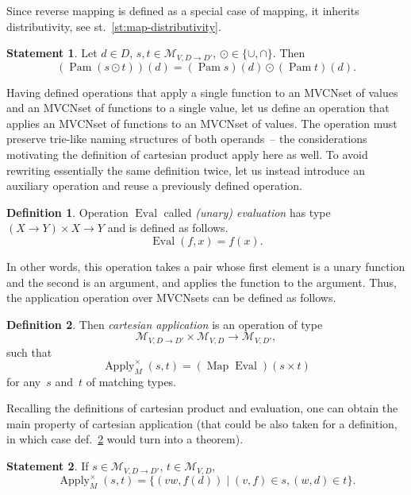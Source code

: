 \documentclass{article}
\theoremstyle{definition}
\newtheorem{Df}{Definition}
\newtheorem{St}{Statement}
\newcommand{\setcharmvcn}{M}
\newcommand{\setsymbol}[3]{\mathcal{#1}_{#2,#3}}
\newcommand{\setmvcn}[2]{\setsymbol{\setcharmvcn}{#1}{#2}}
\newcommand{\fmap}{\operatorname{Map}}
\newcommand{\fpam}{\operatorname{Pam}}
\newcommand{\apply}{\operatorname{Apply}}
\newcommand{\eval}{\operatorname{Eval}}
\begin{document}
Since reverse mapping is defined as a special case of mapping, it inherits
distributivity, see st.~\ref{st:map-distributivity}.

\begin{St}\label{st:pam-distributivity}
Let $d\in D$, $s, t \in \setmvcn{V}{D \to D'}$, $\odot \in \{\cup, \cap \}$. Then
\[
  (\fpam (s \odot t))(d) = (\fpam s)(d) \odot (\fpam t)(d) .
\]
\end{St}

Having defined operations that apply a single function to an MVCNset of values
and an MVCNset of functions to a single value, let us define an
operation that applies an MVCNset of functions to an MVCNset of values. The
operation must preserve trie-like naming structures of both operands~-- the
considerations motivating the definition of cartesian product apply here
as well. To avoid rewriting essentially the same definition twice, let us
instead introduce an auxiliary operation and reuse a previously defined
operation.

\begin{Df}\label{df:eval}
Operation $\eval$ called \emph{(unary) evaluation} has type
$(X \to Y) \times X \to Y$ and is defined as follows.
\[
  \eval (f, x) = f(x) .
\]
\end{Df}

In other words, this operation takes a pair whose first element is a unary
function and the second is an argument, and applies the function to the
argument. Thus, the application operation over MVCNsets can be defined as
follows.

\begin{Df}\label{df:mvcn-apply-cartesian}
Then \emph{cartesian application} is an operation of type
\[
\setmvcn{V}{D\to D'} \times \setmvcn{V}{D} \to \setmvcn{V}{D'} ,
\]
such that
\[
  \apply_{\setcharmvcn}^{\times} (s, t) = (\fmap \eval) (s \times t)
\]
for any~$s$ and~$t$ of matching types.
\end{Df}

Recalling the definitions of cartesian product and evaluation, one can
obtain the main property of cartesian application (that could be also taken
for a definition, in which case def.~\ref{df:mvcn-apply-cartesian} would turn
into a theorem).
 
\begin{St}\label{st:mvcn-apply-cartesian}
If $s\in \setmvcn{V}{D\to D'}$, $t\in \setmvcn{V}{D}$,
\[
  \apply_{\setcharmvcn}^{\times} (s, t) =
    \{ (vw, f(d)) \mid (v,f) \in s, (w,d) \in t \} .
\]
\end{St}
\end{document}
